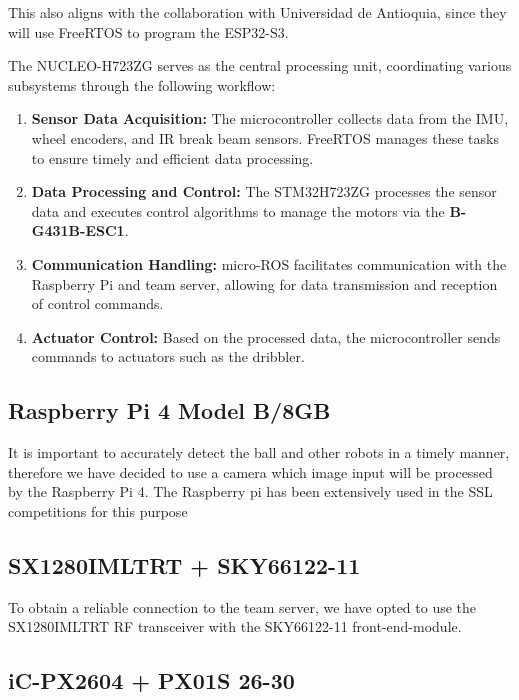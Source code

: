 \documentclass[a4paper,12pt]{article}
\begin{document}
  This also aligns with the collaboration with Universidad de Antioquia,
  since they will use FreeRTOS to program the ESP32-S3.

  The NUCLEO-H723ZG serves as the central processing unit, coordinating
  various subsystems through the following workflow:

  \begin{enumerate}
  \item
    \textbf{Sensor Data Acquisition:} The microcontroller collects data
    from the IMU, wheel encoders, and IR break beam sensors. FreeRTOS
    manages these tasks to ensure timely and efficient data processing.

  \item
    \textbf{Data Processing and Control:} The STM32H723ZG processes the
    sensor data and executes control algorithms to manage the motors via
    the \textbf{B-G431B-ESC1}.

  \item
    \textbf{Communication Handling:} micro-ROS facilitates communication
    with the Raspberry Pi and team server, allowing for data
    transmission and reception of control commands.

  \item
    \textbf{Actuator Control:} Based on the processed data, the
    microcontroller sends commands to actuators such as the dribbler.
  \end{enumerate}

  \subsection*{Raspberry Pi 4 Model B/8GB}

  It is important to accurately detect the ball and other robots in a
  timely manner, therefore we have decided to use a camera which image
  input will be processed by the Raspberry Pi 4. The Raspberry pi has
  been extensively used in the SSL competitions for this purpose
  \cite{ommerExtendedTeamDescription}\cite{satoGreenTea2024Team}

  \subsection*{SX1280IMLTRT + SKY66122-11}

  To obtain a reliable connection to the team server, we have opted to use the SX1280IMLTRT RF transceiver with the SKY66122-11 front-end-module.  

  \subsection*{iC-PX2604 + PX01S 26-30}
\end{document}
